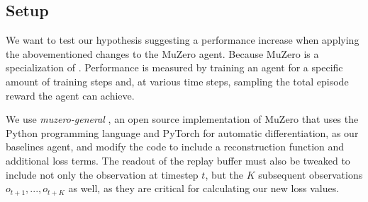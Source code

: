 \subsection{Setup}
We want to test our hypothesis suggesting a performance increase when applying the abovementioned changes to the MuZero agent. Because MuZero is a specialization of . Performance is measured by training an agent for a specific amount of training steps and, at various time steps, sampling the total episode reward the agent can achieve.

We use \textit{muzero-general} \cite{muzero-general}, an open source implementation of MuZero that uses the Python programming language and PyTorch for automatic differentiation, as our baselines agent, and modify the code to include a reconstruction function and additional loss terms. The readout of the replay buffer must also be tweaked to include not only the observation at timestep $t$, but the $K$ subsequent observations $o_{t+1}, ..., o_{t+K}$ as well, as they are critical for calculating our new loss values.

